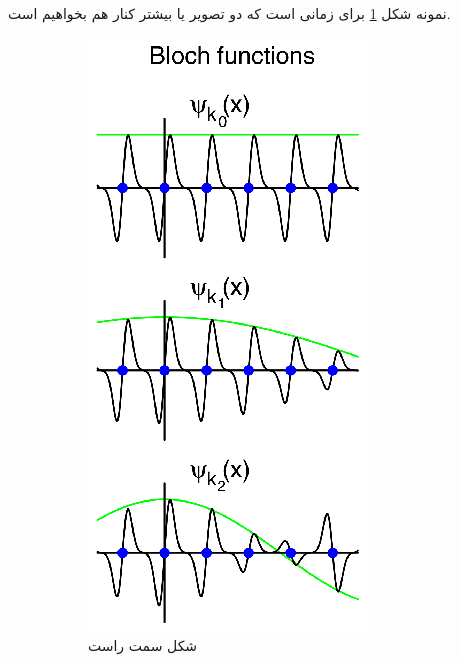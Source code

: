  نمونه شکل \ref{fig:bloch} برای زمانی است که دو تصویر یا بیشتر کنار هم بخواهیم  است.
\begin{figure}[ht]
    \centering
    \begin{subfigure}[b]{0.4\textwidth}
        \includegraphics{bloch}
        \caption{شکل سمت راست}
        \label{fig:bloch}
    \end{subfigure}
    ~ %
    \begin{subfigure}[b]{0.4\textwidth}

\end{subfigure}
\end{figure}
